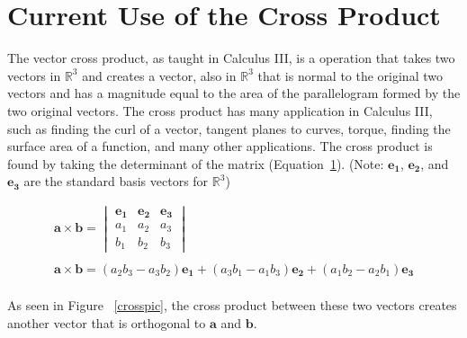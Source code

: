 \documentclass{amsart}
\begin{document}
	\section{Current Use of the Cross Product} \label{cross}
		The vector cross product, as taught in Calculus III, is a operation that takes two vectors in $\mathbb{R}^3$ and creates a vector, also in $\mathbb{R}^3$ that is normal to the original two vectors and has a magnitude equal to the area of the parallelogram formed by the two original vectors. The cross product has many application in Calculus III, such as finding the curl of a vector, tangent planes to curves, torque, finding the surface area of a function, and many other applications. The cross product is found by taking the determinant of the matrix (Equation~\ref{cross}). (Note: $\mathbf{e_1}$, $\mathbf{e_2}$, and $\mathbf{e_3}$ are the standard basis vectors for $\mathbb{R}^3$) 
		
		\begin{gather}
			\label{cross}
				\mathbf{a} \times \mathbf{b} = 
					\begin{vmatrix} 
					\mathbf{e_1}&\mathbf{e_2}&\mathbf{e_3}\\
					a_1&a_2&a_3\\
					b_1&b_2&b_3
					\end{vmatrix}\\  
			\nonumber \\
			\nonumber
			\mathbf{a} \times \mathbf{b} = (a_2 b_3 - a_3 b_2)\mathbf{e_1} + (a_3 b_1 - a_1 b_3)\mathbf{e_2} + (a_1 b_2 - a_2 b_1)\mathbf{e_3}
		\end{gather}\\

		
		As seen in Figure ~\ref{crosspic}, the cross product between these two vectors creates another vector that is orthogonal to $\mathbf{a}$ and $\mathbf{b}$.
		

		
\end{document}
